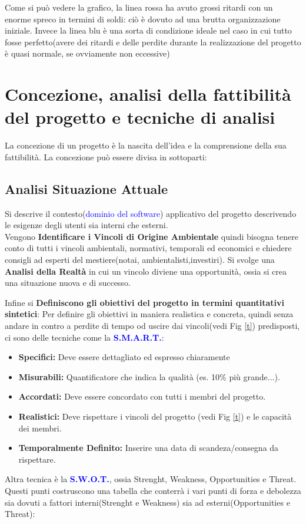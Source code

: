 \documentclass{report}
\begin{document}
Come si può vedere la grafico, la linea rossa ha avuto grossi ritardi con un enorme spreco in termini di soldi: ciò è dovuto ad una brutta organizzazione iniziale.
Invece la linea blu è una sorta di condizione ideale nel caso in cui tutto fosse perfetto(avere dei ritardi e delle perdite durante la realizzazione del progetto è quasi normale, se ovviamente non eccessive)

\section{Concezione, analisi della fattibilità del progetto e tecniche di analisi}
La concezione di un progetto è la nascita dell'idea e la comprensione della sua fattibilità.
La concezione può essere divisa in sottoparti:

\subsection{Analisi Situazione Attuale}
Si descrive il contesto(\textcolor{blue}{dominio del software}) applicativo del progetto descrivendo le esigenze degli utenti sia interni che esterni.\\
Vengono \textbf{Identificare i Vincoli di Origine Ambientale} quindi bisogna tenere conto di tutti i vincoli ambientali, normativi, temporali ed economici e chiedere consigli ad esperti del mestiere(notai, ambientalisti,investiri).
Si svolge una \textbf{Analisi della Realtà} in cui un vincolo diviene una opportunità, ossia si crea una situazione nuova e di successo.

Infine si \textbf{Definiscono gli obiettivi del progetto in termini quantitativi sintetici}:
Per definire gli obiettivi in maniera realistica e concreta, quindi senza andare in contro a perdite di tempo od uscire dai vincoli(vedi Fig \ref{t}) predisposti, ci sono delle tecniche come
la \textbf{\textcolor{blue}{S.M.A.R.T.}}:
\begin{itemize}
	\item \textbf{Specifici:} Deve essere dettagliato ed espresso chiaramente
	\item \textbf{Misurabili:} Quantificatore che indica la qualità (es. 10\% più grande...).
	\item \textbf{Accordati:} Deve essere concordato con tutti i membri del progetto.
	\item \textbf{Realistici:} Deve rispettare i vincoli del progetto (vedi Fig \ref{t}) e le 										capacità dei membri.
	\item \textbf{Temporalmente Definito:} Inserire una data di scandeza/consegna da rispettare.
\end{itemize}
Altra tecnica è la \textbf{\textcolor{blue}{S.W.O.T.}}, ossia Strenght, Weakness, Opportunities e Threat.
Questi punti costruscono una tabella che conterrà i vari punti di forza e debolezza sia dovuti a fattori interni(Strenght e Weakness) sia ad esterni(Opportunities e Threat):
\end{document}
